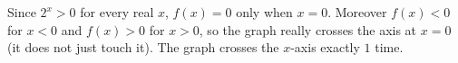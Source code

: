Since $2^x>0$ for every real $x$, $f(x)=0$ only when $x=0$. Moreover $f(x)<0$ for $x<0$ and $f(x)>0$ for $x>0$, so the graph really crosses the axis at $x=0$ (it does not just touch it). The graph crosses the $x$-axis exactly $\boxed{1}$ time.
